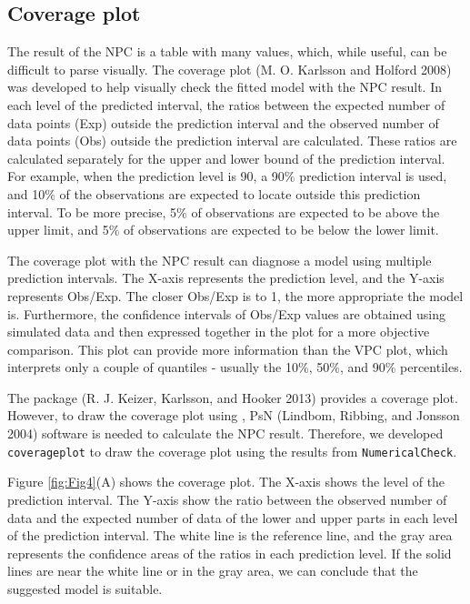 \hypertarget{coverage-plot}{%
\subsection{Coverage plot}\label{coverage-plot}}

The result of the NPC is a table with many values, which, while useful, can be difficult to parse visually. The coverage plot (M. O. Karlsson and Holford 2008) was developed to help visually check the fitted model with the NPC result.
In each level of the predicted interval, the ratios between the expected number of data points (Exp) outside the prediction interval and the observed number of data points (Obs)
outside the prediction interval are calculated. These ratios are calculated separately for the upper and lower bound of the prediction interval. For example, when the prediction level is 90, a 90\(\%\) prediction interval is used, and 10\(\%\) of the observations are expected to locate outside this prediction interval. To be more precise, 5\(\%\) of observations are expected to be above the upper limit, and 5\(\%\) of observations are expected to be below the lower limit.

The coverage plot with the NPC result can diagnose a model using multiple prediction intervals. The X-axis represents the prediction level, and the Y-axis represents Obs/Exp. The closer Obs/Exp is to 1, the more appropriate the model is. Furthermore, the confidence intervals of Obs/Exp values are obtained using simulated data and then expressed together in the plot for a more objective comparison. This plot can provide more information than the VPC plot, which interprets only a couple of quantiles - usually the 10\(\%\), 50\(\%\), and 90\(\%\) percentiles.

The  package (R. J. Keizer, Karlsson, and Hooker 2013) provides a coverage plot. However,
to draw the coverage plot using , PsN (Lindbom, Ribbing, and Jonsson 2004) software is needed to calculate the NPC result. Therefore, we developed \texttt{coverageplot} to draw the coverage plot using the results from \texttt{NumericalCheck}.

Figure \ref{fig:Fig4}(A) shows the coverage plot. The X-axis shows the level of the prediction interval. The Y-axis show the ratio between the observed number of data and the expected number of data of the lower and upper parts in each level of the prediction interval. The white line is the reference line, and the gray area represents the confidence areas of the ratios in each prediction level. If the solid lines are near the white line or in the gray area, we can conclude that the suggested model is suitable.

